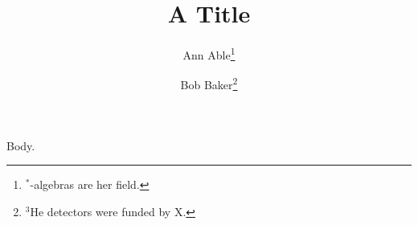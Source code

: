 \documentclass{article}
\title{A Title}
\author{Ann Able\thanks{$^*$-algebras are her field.} \and Bob Baker\thanks{$^{3}$He detectors were funded by X.}}
\begin{document}
\maketitle
Body.
\end{document}

